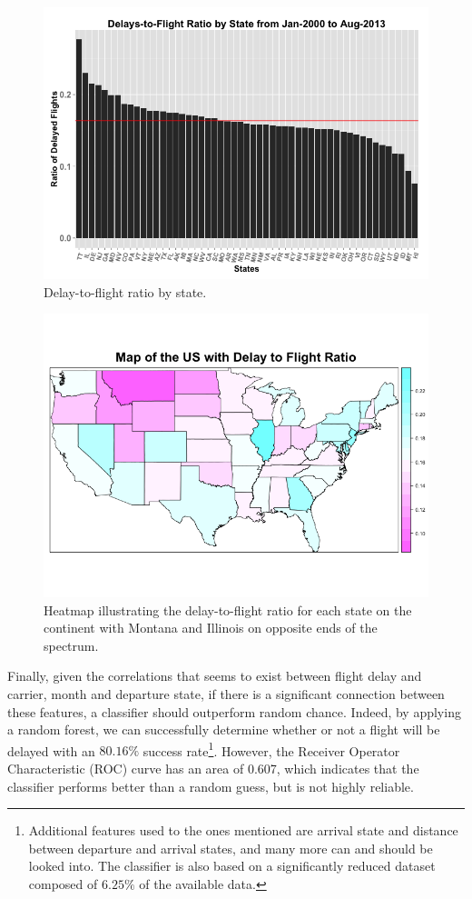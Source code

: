 \documentclass[11pt,twoside,titlepage]{article}
\begin{document}
\begin{figure}[h!]
        \centering
                \includegraphics[width=17cm]{Delays_by_State2.png}
        \caption{Delay-to-flight ratio by state.}\label{fig:Delays by State as Percentage}
\end{figure}

\begin{figure}[h!]
        \centering
                \includegraphics[width=14cm]{USMap2.png}
        \caption{Heatmap illustrating the delay-to-flight ratio for each state on the continent with Montana and Illinois on opposite ends of the spectrum.}\label{fig:USMap2}
\end{figure}

Finally, given the correlations that seems to exist between flight delay and carrier, month and departure state, if there is a significant connection between these features, a classifier should outperform random chance. Indeed, by applying a random forest, we can successfully determine whether or not a flight will be delayed with an $80.16\%$ success rate\footnote{Additional features used to the ones mentioned are arrival state and distance between departure and arrival states, and many more can and should be looked into. The classifier is also based on a significantly reduced dataset composed of $6.25\%$ of the available data.}. However, the Receiver Operator Characteristic (ROC) curve has an area of 0.607, which indicates that the classifier performs better than a random guess, but is not highly reliable.
\end{document}
